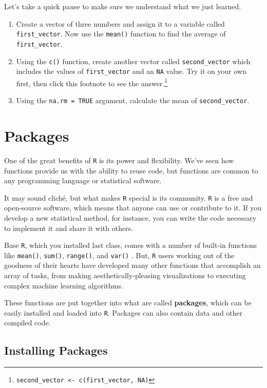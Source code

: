 \documentclass[
]{book}
\providecommand{\tightlist}{%
  \setlength{\itemsep}{0pt}\setlength{\parskip}{0pt}}
\begin{document}
Let's take a quick pause to make sure we understand what we just learned.

\begin{enumerate}
\def\labelenumi{\arabic{enumi}.}
\tightlist
\item
  Create a vector of three numbers and assign it to a variable called \texttt{first\_vector}. Now use the \texttt{mean()} function to find the average of \texttt{first\_vector}.
\item
  Using the \texttt{c()} function, create another vector called \texttt{second\_vector} which includes the values of \texttt{first\_vector} and an \texttt{NA} value. Try it on your own first, then click this footnote to see the answer.\footnote{\texttt{second\_vector\ \textless{}-\ c(first\_vector,\ NA)}}
\item
  Using the \texttt{na.rm\ =\ TRUE} argument, calculate the mean of \texttt{second\_vector}.
\end{enumerate}

\hypertarget{packages}{%
\section{Packages}\label{packages}}

One of the great benefits of \texttt{R} is its power and flexibility. We've seen how functions provide us with the ability to reuse code, but functions are common to any programming language or statistical software.

It may sound cliché, but what makes \texttt{R} special is its community. \texttt{R} is a free and open-source software, which means that anyone can use or contribute to it. If you develop a new statistical method, for instance, you can write the code necessary to implement it and share it with others.

Base \texttt{R}, which you installed last class, comes with a number of built-in functions like \texttt{mean()}, \texttt{sum()}, \texttt{range()}, and \texttt{var()} . But, \texttt{R} users working out of the goodness of their hearts have developed many other functions that accomplish an array of tasks, from making aesthetically-pleasing visualizations to executing complex machine learning algorithms.

These functions are put together into what are called \textbf{packages}, which can be easily installed and loaded into \texttt{R}. Packages can also contain data and other compiled code.

\hypertarget{installing-packages}{%
\subsection{Installing Packages}\label{installing-packages}}
\end{document}
